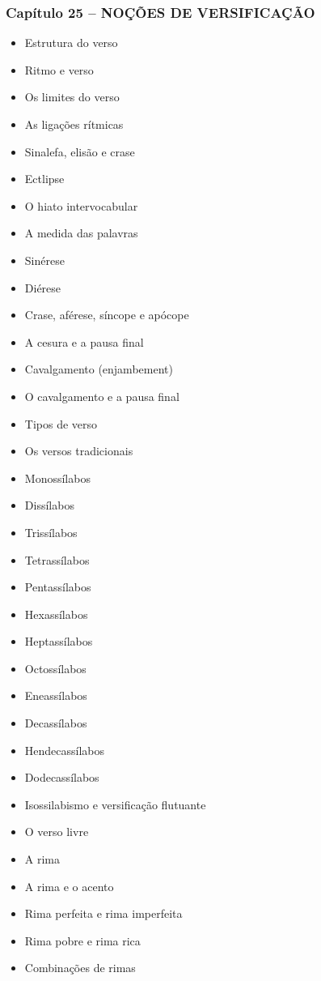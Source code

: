 \documentclass[a4paper,12pt]{article}[abntex2]
\begin{document}
\subsubsection*{Capítulo 25 – NOÇÕES DE VERSIFICAÇÃO}
\begin{itemize}
    \item Estrutura do verso
    \item Ritmo e verso
    \item Os limites do verso
    \item As ligações rítmicas
    \item Sinalefa, elisão e crase
    \item Ectlipse
    \item O hiato intervocabular
    \item A medida das palavras
    \item Sinérese
    \item Diérese
    \item Crase, aférese, síncope e apócope
    \item A cesura e a pausa final
    \item Cavalgamento (enjambement)
    \item O cavalgamento e a pausa final
    \item Tipos de verso
    \item Os versos tradicionais
    \item Monossílabos
    \item Dissílabos
    \item Trissílabos
    \item Tetrassílabos
    \item Pentassílabos
    \item Hexassílabos
    \item Heptassílabos
    \item Octossílabos
    \item Eneassílabos
    \item Decassílabos
    \item Hendecassílabos
    \item Dodecassílabos
    \item Isossilabismo e versificação flutuante
    \item O verso livre
    \item A rima
    \item A rima e o acento
    \item Rima perfeita e rima imperfeita
    \item Rima pobre e rima rica
    \item Combinações de rimas

\end{itemize}
\end{document}
